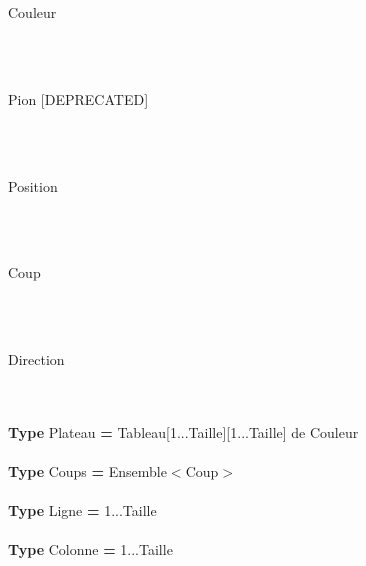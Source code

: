 \begin{algorithme}
	\begin{enregistrement}{Couleur}
	\end{enregistrement}
\\ \\
	\begin{enregistrement}{Pion [DEPRECATED]}
	\end{enregistrement}
\\ \\
	\begin{enregistrement}{Position}
	\end{enregistrement}
\\ \\
	\begin{enregistrement}{Coup}
	\end{enregistrement}
\\ \\
	\begin{enregistrement}{Direction}
	\end{enregistrement}
\\ \\
	\textbf{Type} Plateau \textbf{=} Tableau[1...Taille][1...Taille] de Couleur
\\ \\
	\textbf{Type} Coups \textbf{=} Ensemble$<$Coup$>$
\\ \\
	\textbf{Type} Ligne \textbf{=} 1...Taille
\\ \\
	\textbf{Type} Colonne \textbf{=} 1...Taille
\end{algorithme}
